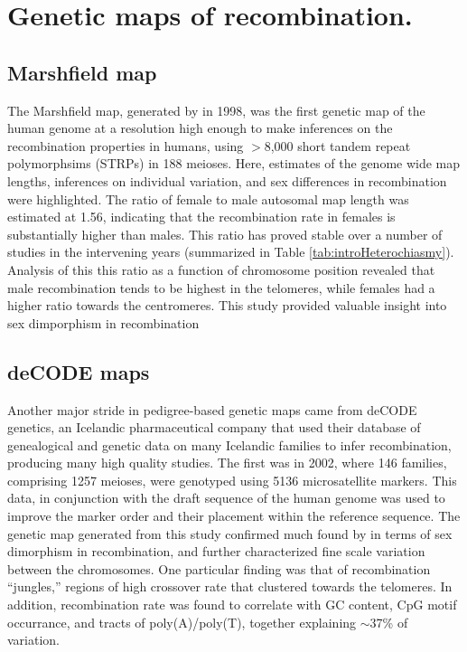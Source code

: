 \section{Genetic maps of recombination.}

\subsection{Marshfield map}
The Marshfield map, generated by \citet{Broman1998} in 1998, was the first genetic map of the human genome at a resolution high enough to make inferences on the recombination properties in humans, using $>$8,000 short tandem repeat polymorphsims (STRPs) in 188 meioses.
Here, estimates of the genome wide map lengths, inferences on individual variation, and sex differences in recombination were highlighted.
The ratio of female to male autosomal map length was estimated at 1.56, indicating that the recombination rate in females is substantially higher than males.
This ratio has proved stable over a number of studies in the intervening years (summarized in Table \ref{tab:introHeterochiasmy}).
Analysis of this this ratio as a function of chromosome position revealed that male recombination tends to be highest in the telomeres, while females had a higher ratio towards the centromeres.
This study provided valuable insight into sex dimporphism in recombination

\subsection{deCODE maps}
Another major stride in pedigree-based genetic maps came from deCODE genetics, an Icelandic pharmaceutical company that used their database of genealogical and genetic data on many Icelandic families to infer recombination, producing many high quality studies.
The first was in 2002, where 146 families, comprising 1257 meioses, were genotyped using 5136 microsatellite markers\cite{Kong2002}.
This data, in conjunction with the draft sequence of the human genome\cite{Venter2001,Lander2001} was used to improve the marker order and their placement within the reference sequence.
The genetic map generated from this study confirmed much found by \citet{Broman1998} in terms of sex dimorphism in recombination, and further characterized fine scale variation between the chromosomes.
One particular finding was that of recombination ``jungles,'' regions of high crossover rate that clustered towards the telomeres.
In addition, recombination rate was found to correlate with GC content, CpG motif occurrance, and tracts of poly(A)/poly(T), together explaining $\sim$37\% of variation.

